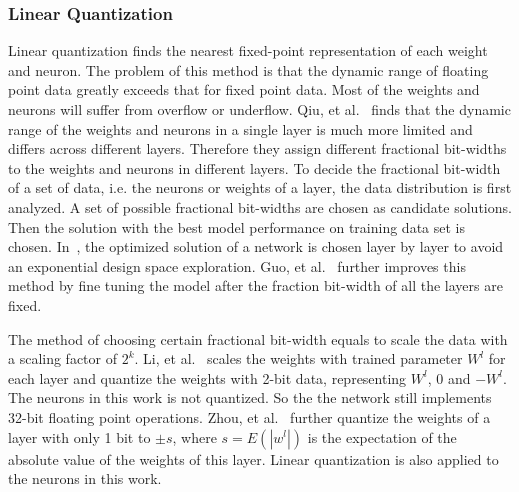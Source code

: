 \subsubsection{Linear Quantization}
Linear quantization finds the nearest fixed-point representation of each weight and neuron. The problem of this method is that the dynamic range of floating point data greatly exceeds that for fixed point data. Most of the weights and neurons will suffer from overflow or underflow. Qiu, et al.~\cite{qiu2016going} finds that the dynamic range of the weights and neurons in a single layer is much more limited and differs across different layers. Therefore they assign different fractional bit-widths to the weights and neurons in different layers. To decide the fractional bit-width of a set of data, i.e. the neurons or weights of a layer, the data distribution is first analyzed. A set of possible fractional bit-widths are chosen as candidate solutions. Then the solution with the best model performance on training data set is chosen. In~\cite{qiu2016going}, the optimized solution of a network is chosen layer by layer to avoid an exponential design space exploration. Guo, et al.~\cite{guo2017angel} further improves this method by fine tuning the model after the fraction bit-width of all the layers are fixed.

The method of choosing certain fractional bit-width equals to scale the data with a scaling factor of $2^k$. Li, et al.~\cite{li2016ternary} scales the weights with trained parameter $W^l$ for each layer and quantize the weights with 2-bit data, representing $W^l$, 0 and $-W^l$. The neurons in this work is not quantized. So the the network still implements 32-bit floating point operations. Zhou, et al.~\cite{zhou2016dorefa} further quantize the weights of a layer with only 1 bit to $\pm s$, where $s=E(|w^l|)$ is the expectation of the absolute value of the weights of this layer. Linear quantization is also applied to the neurons in this work.

